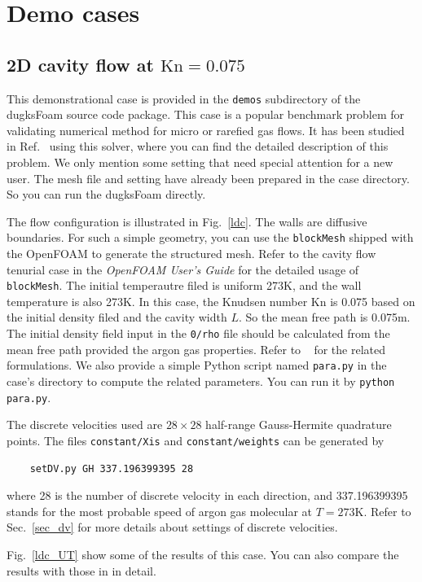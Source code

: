 \chapter{Demo cases}
\section{2D cavity flow at $\text{Kn}=0.075$}
\label{sec_cavity}
This demonstrational case is provided in the \verb|demos| subdirectory of the dugksFoam source code package.
This case is a popular benchmark problem for validating numerical method for micro or rarefied gas flows.
It has been studied in Ref.~\cite{zhulh15} using this solver,
where you can find the detailed description of this problem.
We only mention some setting that need special attention for a new user.
The mesh file and setting have already been prepared in the case directory.
So you can run the dugksFoam directly.

The flow configuration is illustrated in Fig.~\ref{ldc}.
The walls are diffusive boundaries.
For such a simple geometry, you can use the \verb|blockMesh| shipped with the OpenFOAM to generate the structured mesh.
Refer to the cavity flow tenurial case in the \emph{OpenFOAM User's Guide} for the detailed usage of \verb|blockMesh|.
The initial temperautre filed is uniform 273K, and the wall temperature is also 273K.
In this case, the Knudsen number Kn is 0.075 based on the initial density filed and the cavity width $L$.
So the mean free path is 0.075m.
The initial density field input in the \verb|0/rho| file should be calculated from the mean free path provided the argon gas properties.
Refer to ~\cite{zhulhA} for the related formulations.
We also provide a simple Python script named \verb|para.py| in the case's directory to compute the related parameters.
You can run it by \verb|python para.py|.


The discrete velocities used are $28\times28$ half-range Gauss-Hermite quadrature points.
The files \verb|constant/Xis| and \verb|constant/weights| can be generated by
\begin{verbatim}
    setDV.py GH 337.196399395 28
\end{verbatim}
where 28 is the number of discrete velocity in each direction, and 337.196399395 stands for the most probable speed of argon gas molecular at $T=273$K.
Refer to Sec.~\ref{sec_dv} for more details about settings of discrete velocities.

Fig.~\ref{ldc_UT} show some of the results of this case.
You can also compare the results with those in \cite{lhzhuA} in detail.

